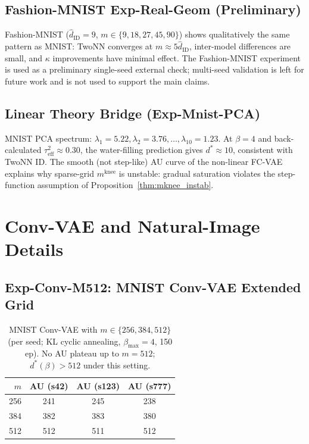 \documentclass[11pt,a4paper]{article}
\newcommand{\kap}{\kappa}
\newcommand{\mknee}{m^{\mathrm{knee}}}
\newcommand{\hatdID}{\hat{d}_{\mathrm{ID}}}
\begin{document}
\subsection{Fashion-MNIST Exp-Real-Geom (Preliminary)}

Fashion-MNIST ($\hatdID=9$, $m\in\{9,18,27,45,90\}$) shows qualitatively the
same pattern as MNIST: TwoNN converges at $m\approx5\hatdID$, inter-model
differences are small, and $\kap$ improvements have minimal effect.
The Fashion-MNIST experiment is used as a preliminary single-seed external check;
multi-seed validation is left for future work and is not used to support the main claims.

\subsection{Linear Theory Bridge (Exp-Mnist-PCA)}

MNIST PCA spectrum: $\lambda_1=5.22, \lambda_2=3.76,\ldots,\lambda_{10}=1.23$.
At $\beta=4$ and back-calculated $\tau^2_{\mathrm{eff}}\approx0.30$, the
water-filling prediction gives $d^*\approx10$, consistent with TwoNN ID.
The smooth (not step-like) AU curve of the non-linear FC-VAE explains why
sparse-grid $\mknee$ is unstable: gradual saturation violates the
step-function assumption of Proposition~\ref{thm:mknee_instab}.

\section{Conv-VAE and Natural-Image Details}\label{app:convvae_natimg}

\subsection{Exp-Conv-M512: MNIST Conv-VAE Extended Grid}

\begin{table}[H]
\centering
\caption{MNIST Conv-VAE with $m\in\{256,384,512\}$ (per seed; KL cyclic annealing,
$\beta_{\max}=4$, 150 ep).
No AU plateau up to $m=512$; $d^*(\beta)>512$ under this setting.}
\small
\begin{tabular}{rccc}
\toprule
$m$ & AU (s42) & AU (s123) & AU (s777) \\
\midrule
256 & 241 & 245 & 238 \\
384 & 382 & 383 & 380 \\
512 & 512 & 511 & 512 \\
\bottomrule
\end{tabular}
\end{table}
\end{document}

